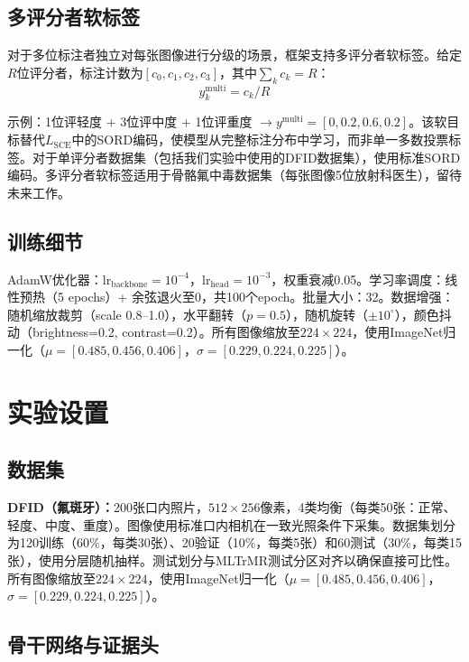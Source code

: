 \documentclass[12pt,a4paper]{ctexart}
\begin{document}
\subsection{多评分者软标签}

对于多位标注者独立对每张图像进行分级的场景，框架支持多评分者软标签。给定$R$位评分者，标注计数为$[c_0, c_1, c_2, c_3]$，其中$\sum_k c_k = R$：
\begin{equation}
    y_k^{\mathrm{multi}} = c_k / R
\end{equation}

示例：1位评轻度 $+$ 3位评中度 $+$ 1位评重度 $\to y^{\mathrm{multi}} = [0, 0.2, 0.6, 0.2]$。该软目标替代$L_{\mathrm{SCE}}$中的SORD编码，使模型从完整标注分布中学习，而非单一多数投票标签。对于单评分者数据集（包括我们实验中使用的DFID数据集），使用标准SORD编码。多评分者软标签适用于骨骼氟中毒数据集（每张图像5位放射科医生）\cite{xu2025mwinc}，留待未来工作。

\subsection{训练细节}

AdamW优化器：$\mathrm{lr}_{\mathrm{backbone}} = 10^{-4}$，$\mathrm{lr}_{\mathrm{head}} = 10^{-3}$，权重衰减0.05。学习率调度：线性预热（5 epochs）+ 余弦退火至0，共100个epoch。批量大小：32。数据增强：随机缩放裁剪（scale 0.8--1.0），水平翻转（$p=0.5$），随机旋转（$\pm 10^\circ$），颜色抖动（brightness=0.2, contrast=0.2）。所有图像缩放至$224 \times 224$，使用ImageNet归一化（$\mu=[0.485,0.456,0.406]$，$\sigma=[0.229,0.224,0.225]$）。

\section{实验设置}

\subsection{数据集}

\textbf{DFID（氟斑牙）：}200张口内照片，$512 \times 256$像素，4类均衡（每类50张：正常、轻度、中度、重度）。图像使用标准口内相机在一致光照条件下采集。数据集划分为120训练（60\%，每类30张）、20验证（10\%，每类5张）和60测试（30\%，每类15张），使用分层随机抽样。测试划分与MLTrMR测试分区对齐以确保直接可比性\cite{xu2025mltrmr}。所有图像缩放至$224 \times 224$，使用ImageNet归一化（$\mu=[0.485, 0.456, 0.406]$，$\sigma=[0.229, 0.224, 0.225]$）。

\subsection{骨干网络与证据头}
\end{document}
